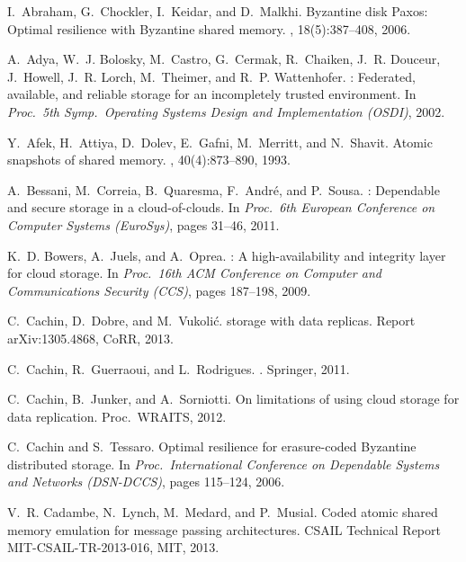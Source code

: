 \documentclass[oribibl]{llncs}
\theoremstyle{definition-boldhead}
\begin{document}
\begin{thebibliography}{10}

I.~Abraham, G.~Chockler, I.~Keidar, and D.~Malkhi.
\newblock Byzantine disk {Paxos}: Optimal resilience with {Byzantine} shared
  memory.
, 18(5):387--408, 2006.

A.~Adya, W.~J. Bolosky, M.~Castro, G.~Cermak, R.~Chaiken, J.~R. Douceur,
  J.~Howell, J.~R. Lorch, M.~Theimer, and R.~P. Wattenhofer.
: Federated, available, and reliable storage for an
  incompletely trusted environment.
\newblock In {\em Proc.\ 5th Symp.\ Operating Systems Design and Implementation
  (OSDI)}, 2002.

Y.~Afek, H.~Attiya, D.~Dolev, E.~Gafni, M.~Merritt, and N.~Shavit.
\newblock Atomic snapshots of shared memory.
, 40(4):873--890, 1993.

A.~Bessani, M.~Correia, B.~Quaresma, F.~Andr\'{e}, and P.~Sousa.
: Dependable and secure storage in a cloud-of-clouds.
\newblock In {\em Proc.\ 6th European Conference on Computer Systems
  (EuroSys)}, pages 31--46, 2011.

K.~D. Bowers, A.~Juels, and A.~Oprea.
: A high-availability and integrity layer for cloud storage.
\newblock In {\em Proc.\ 16th ACM Conference on Computer and Communications
  Security (CCS)}, pages 187--198, 2009.

C.~Cachin, D.~Dobre, and M.~Vukoli{\'c}.
 storage with  data replicas.
\newblock Report arXiv:1305.4868, CoRR, 2013.

C.~Cachin, R.~Guerraoui, and L.~Rodrigues.
.
\newblock Springer, 2011.

C.~Cachin, B.~Junker, and A.~Sorniotti.
\newblock On limitations of using cloud storage for data replication.
\newblock Proc.\ WRAITS, 2012.

C.~Cachin and S.~Tessaro.
\newblock Optimal resilience for erasure-coded {Byzantine} distributed storage.
\newblock In {\em Proc.\ International Conference on Dependable Systems and
  Networks (DSN-DCCS)}, pages 115--124, 2006.

V.~R. Cadambe, N.~Lynch, M.~Medard, and P.~Musial.
\newblock Coded atomic shared memory emulation for message passing
  architectures.
\newblock CSAIL Technical Report MIT-CSAIL-TR-2013-016, MIT, 2013.


\end{thebibliography}
\end{document}

